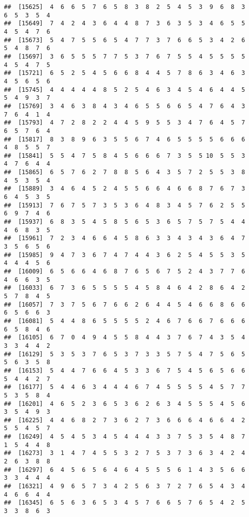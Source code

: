 \documentclass[
]{book}
\begin{document}
\begin{verbatim}
##  [15625]  4  6  6  5  7  6  5  8  3  8  2  5  4  5  3  9  6  8  3  6  5  3  5  4
##  [15649]  7  4  2  4  3  6  4  4  8  7  3  6  3  5  3  4  6  5  5  4  5  4  7  6
##  [15673]  5  4  7  5  5  6  5  4  7  7  3  7  6  6  5  3  4  2  6  5  4  8  7  6
##  [15697]  3  6  5  5  5  7  7  5  3  7  6  7  5  5  4  5  5  5  5  4  5  4  7  5
##  [15721]  6  5  2  5  4  5  6  6  8  4  4  5  7  8  6  3  4  6  3  4  5  6  5  6
##  [15745]  4  4  4  4  4  8  5  2  5  4  6  3  4  5  4  6  4  4  5  5  4  9  3  7
##  [15769]  3  4  6  3  8  4  3  4  6  5  5  6  6  5  4  7  6  4  3  7  6  4  1  4
##  [15793]  4  7  2  8  2  2  4  4  5  9  5  5  3  4  7  6  4  5  7  6  5  7  6  4
##  [15817]  8  3  8  9  6  3  5  5  6  7  4  6  5  5  5  5  6  6  6  4  8  5  5  7
##  [15841]  5  5  4  7  5  8  4  5  6  6  6  7  3  5  5 10  5  5  3  4  7  6  4  4
##  [15865]  6  5  7  6  2  7  8  8  5  6  4  3  5  7  2  5  5  3  8  4  5  3  5  4
##  [15889]  3  4  6  4  5  2  4  5  5  6  6  4  6  6  8  7  6  7  3  6  4  5  3  5
##  [15913]  7  6  7  5  7  3  5  3  6  4  8  3  4  5  7  6  2  5  5  6  9  7  4  6
##  [15937]  6  8  3  5  4  5  8  5  6  5  3  6  5  7  5  7  5  4  4  4  6  8  3  5
##  [15961]  7  2  3  4  6  6  4  5  8  6  3  3  4  3  4  3  6  4  7  3  5  6  5  6
##  [15985]  9  4  7  3  6  7  4  7  4  4  3  6  2  5  4  5  5  3  5  4  4  4  5  6
##  [16009]  6  5  6  6  4  6  8  7  6  5  6  7  5  2  4  3  7  7  6  4  6  6  3  5
##  [16033]  6  7  3  6  5  5  5  5  4  5  8  4  6  4  2  8  6  4  2  5  7  8  4  5
##  [16057]  7  3  7  5  6  7  6  6  2  6  4  4  5  4  6  6  8  6  6  6  5  6  6  3
##  [16081]  5  4  4  8  6  5  5  5  5  2  4  6  7  6  6  7  6  6  6  6  5  8  4  6
##  [16105]  6  7  0  4  9  4  5  5  8  4  4  3  7  6  7  4  3  5  4  3  3  4  4  2
##  [16129]  5  3  5  3  7  6  5  3  7  3  3  5  7  5  4  7  5  6  5  5  6  3  5  8
##  [16153]  5  4  4  7  6  6  4  5  3  3  6  7  5  4  5  6  5  6  6  5  4  4  2  7
##  [16177]  5  4  4  6  3  4  4  4  6  7  4  5  5  5  5  4  5  7  7  5  3  5  8  4
##  [16201]  4  6  5  2  3  6  5  3  6  2  6  3  4  5  5  5  4  5  6  3  5  4  9  3
##  [16225]  4  4  6  8  2  7  3  6  2  7  3  6  6  6  4  6  6  4  2  5  5  4  5  7
##  [16249]  4  5  4  5  3  4  5  4  4  4  3  3  7  5  3  5  4  8  7  1  5  4  4  8
##  [16273]  3  1  4  7  4  5  5  3  2  7  5  3  7  3  6  3  4  2  4  2  6  3  8  8
##  [16297]  6  4  5  6  5  6  4  6  4  5  5  5  6  1  4  3  5  6  6  3  3  4  4  4
##  [16321]  4  9  6  5  7  3  4  2  5  6  3  7  2  7  6  5  4  3  4  4  6  6  4  4
##  [16345]  6  5  6  3  6  5  3  4  5  7  6  6  5  7  6  5  4  2  5  3  3  8  6  3

\end{verbatim}
\end{document}
